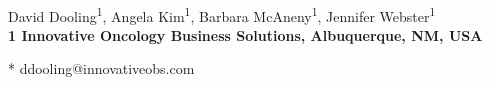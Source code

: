 \documentclass[10pt,letterpaper]{article}
\date{}
\begin{document}
\vspace*{0.35in}

\begin{flushleft}
{\Large
\textbf{}
}
\newline
\\
David Dooling\textsuperscript{1},
Angela Kim\textsuperscript{1},
Barbara McAneny\textsuperscript{1},
Jennifer Webster\textsuperscript{1}
\\
\bigskip
\bf{1} Innovative Oncology Business Solutions, Albuquerque, NM, USA
\\
\bigskip

% 
%





* ddooling@innovativeobs.com

\end{flushleft}
\end{document}
